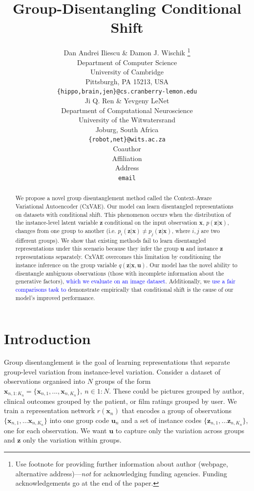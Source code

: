 \documentclass{article} %
\title{Group-Disentangling Conditional Shift}
\author{Dan Andrei Iliescu \& Damon J. Wischik \thanks{ Use footnote for providing further information
about author (webpage, alternative address)---\emph{not} for acknowledging
funding agencies.  Funding acknowledgements go at the end of the paper.} \\
Department of Computer Science\\
University of Cambridge\\
Pittsburgh, PA 15213, USA \\
\texttt{\{hippo,brain,jen\}@cs.cranberry-lemon.edu} \\
\And
Ji Q. Ren \& Yevgeny LeNet \\
Department of Computational Neuroscience \\
University of the Witwatersrand \\
Joburg, South Africa \\
\texttt{\{robot,net\}@wits.ac.za} \\
\AND
Coauthor \\
Affiliation \\
Address \\
\texttt{email}
}
\newcommand{\change}[1]{\textcolor{blue}{#1}}
\begin{document}
\maketitle

\begin{abstract}
We propose a novel group disentanglement method called the Context-Aware Variational Autoencoder (CxVAE). Our model can learn disentangled representations on datasets with conditional shift. This phenomenon occurs when the distribution of the instance-level latent variable $\mathbf{z}$ conditional on the input observation $\mathbf{x}$, $p(\mathbf{z}|\mathbf{x})$, changes from one group to another (i.e. $p_i(\mathbf{z}|\mathbf{x}) \neq p_j(\mathbf{z}|\mathbf{x})$, where $i,j$ are two different groups). We show that existing methods fail to learn disentangled representations under this scenario because they infer the group $\mathbf{u}$ and instance $\mathbf{z}$ representations separately. CxVAE overcomes this limitation by conditioning the instance inference on the group variable $q(\mathbf{z}|\mathbf{x},\mathbf{u})$. Our model has the novel ability to disentangle ambiguous observations (those with incomplete information about the generative factors), \change{which we evaluate on an image dataset}. Additionally, we \change{use a fair comparisons task to} demonstrate empirically that conditional shift is the cause of our model's improved performance.
\end{abstract}

\section{Introduction}
\label{intro}

Group disentanglement is the goal of learning representations that separate group-level variation from instance-level variation. Consider a dataset of observations organised into $N$ groups of the form $\mathbf{x}_{n,1:K_n} = \{\mathbf{x}_{n,1}, ..., \mathbf{x}_{n,K_n}\}, ~ n \in 1:N$. These could be pictures grouped by author, clinical outcomes grouped by the patient, or film ratings grouped by user.  We train a representation network $r(\mathbf{x}_n)$ that encodes a group of observations $\{\mathbf{x}_{n, 1}, \dots \mathbf{x}_{n,K_n}\}$ into one group code $\mathbf{u}_n$ and a set of instance codes $\{\mathbf{z}_{n,1}, \dots \mathbf{z}_{n, K_n}\}$, one for each observation. We want $\mathbf{u}$ to capture only the variation across groups and $\mathbf{z}$ only the variation within groups. 
\end{document}
